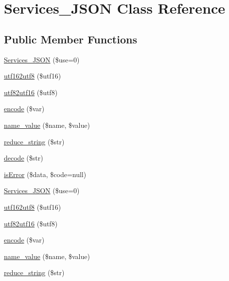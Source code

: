 \hypertarget{class_services___j_s_o_n}{\section{Services\-\_\-\-J\-S\-O\-N Class Reference}
\label{class_services___j_s_o_n}
}
\subsection*{Public Member Functions}
\begin{DoxyCompactItemize}
\item 
\hyperlink{class_services___j_s_o_n_abc84bd855fe129a4c68bcb68b4d17108}{Services\-\_\-\-J\-S\-O\-N} (\$use=0)
\item 
\hyperlink{class_services___j_s_o_n_aa7b1b36cd3a4995bbb60f5def6a216e2}{utf162utf8} (\$utf16)
\item 
\hyperlink{class_services___j_s_o_n_af9687bbf6bcddc9c847d608f9a1fa4c0}{utf82utf16} (\$utf8)
\item 
\hyperlink{class_services___j_s_o_n_acdf1c85111e34b3048d436228bf39819}{encode} (\$var)
\item 
\hyperlink{class_services___j_s_o_n_aa7f3e18209717e584f01f53a0325e9ff}{name\-\_\-value} (\$name, \$value)
\item 
\hyperlink{class_services___j_s_o_n_ae463a3baa44e95fa5b5151ab2334df1c}{reduce\-\_\-string} (\$str)
\item 
\hyperlink{class_services___j_s_o_n_a4afbb486f4a5ff5a8170c832f5997986}{decode} (\$str)
\item 
\hyperlink{class_services___j_s_o_n_a55ae0955466c3970507b122f3f5d1b38}{is\-Error} (\$data, \$code=null)
\item 
\hyperlink{class_services___j_s_o_n_abc84bd855fe129a4c68bcb68b4d17108}{Services\-\_\-\-J\-S\-O\-N} (\$use=0)
\item 
\hyperlink{class_services___j_s_o_n_aa7b1b36cd3a4995bbb60f5def6a216e2}{utf162utf8} (\$utf16)
\item 
\hyperlink{class_services___j_s_o_n_af9687bbf6bcddc9c847d608f9a1fa4c0}{utf82utf16} (\$utf8)
\item 
\hyperlink{class_services___j_s_o_n_acdf1c85111e34b3048d436228bf39819}{encode} (\$var)
\item 
\hyperlink{class_services___j_s_o_n_aa7f3e18209717e584f01f53a0325e9ff}{name\-\_\-value} (\$name, \$value)
\item 
\hyperlink{class_services___j_s_o_n_ae463a3baa44e95fa5b5151ab2334df1c}{reduce\-\_\-string} (\$str)

\end{DoxyCompactItemize}

